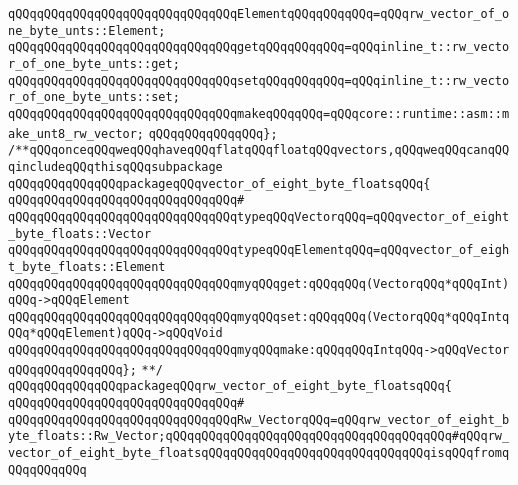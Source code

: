 \verb|qQQqqQQqqQQqqQQqqQQqqQQqqQQqqQQqElementqQQqqQQqqQQq=qQQqrw_vector_of_one_byte_unts::Element;|\newline
\newline
\verb|qQQqqQQqqQQqqQQqqQQqqQQqqQQqqQQqgetqQQqqQQqqQQq=qQQqinline_t::rw_vector_of_one_byte_unts::get;|\newline
\verb|qQQqqQQqqQQqqQQqqQQqqQQqqQQqqQQqsetqQQqqQQqqQQq=qQQqinline_t::rw_vector_of_one_byte_unts::set;|\newline
\newline
\verb|qQQqqQQqqQQqqQQqqQQqqQQqqQQqqQQqmakeqQQqqQQq=qQQqcore::runtime::asm::make_unt8_rw_vector;|\newline
\verb|qQQqqQQqqQQqqQQq};|\newline
\newline
\verb|/**qQQqonceqQQqweqQQqhaveqQQqflatqQQqfloatqQQqvectors,qQQqweqQQqcanqQQqincludeqQQqthisqQQqsubpackage|\newline
\newline
\verb|qQQqqQQqqQQqqQQqpackageqQQqvector_of_eight_byte_floatsqQQq{|\newline
\verb|qQQqqQQqqQQqqQQqqQQqqQQqqQQqqQQq#|\newline
\verb|qQQqqQQqqQQqqQQqqQQqqQQqqQQqqQQqtypeqQQqVectorqQQq=qQQqvector_of_eight_byte_floats::Vector|\newline
\verb|qQQqqQQqqQQqqQQqqQQqqQQqqQQqqQQqtypeqQQqElementqQQq=qQQqvector_of_eight_byte_floats::Element|\newline
\verb|qQQqqQQqqQQqqQQqqQQqqQQqqQQqqQQqmyqQQqget:qQQqqQQq(VectorqQQq*qQQqInt)qQQq->qQQqElement|\newline
\verb|qQQqqQQqqQQqqQQqqQQqqQQqqQQqqQQqmyqQQqset:qQQqqQQq(VectorqQQq*qQQqIntqQQq*qQQqElement)qQQq->qQQqVoid|\newline
\verb|qQQqqQQqqQQqqQQqqQQqqQQqqQQqqQQqmyqQQqmake:qQQqqQQqIntqQQq->qQQqVector|\newline
\verb|qQQqqQQqqQQqqQQq};|\newline
\verb|**/|\newline
\verb|qQQqqQQqqQQqqQQqpackageqQQqrw_vector_of_eight_byte_floatsqQQq{|\newline
\verb|qQQqqQQqqQQqqQQqqQQqqQQqqQQqqQQq#|\newline
\verb|qQQqqQQqqQQqqQQqqQQqqQQqqQQqqQQqRw_VectorqQQq=qQQqrw_vector_of_eight_byte_floats::Rw_Vector;qQQqqQQqqQQqqQQqqQQqqQQqqQQqqQQqqQQqqQQq#qQQqrw_vector_of_eight_byte_floatsqQQqqQQqqQQqqQQqqQQqqQQqqQQqqQQqisqQQqfromqQQqqQQqqQQq|\newline
